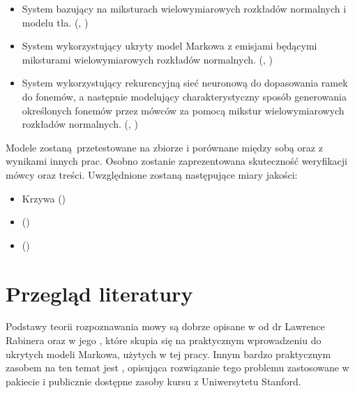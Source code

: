 \begin{itemize}
    \item System bazujący na miksturach wielowymiarowych rozkładów normalnych i modelu tła. (, )
    \item System wykorzystujący ukryty model Markowa z emisjami będącymi miksturami wielowymiarowych rozkładów normalnych. (, )
    \item System wykorzystujący rekurencyjną sieć neuronową do dopasowania ramek do fonemów, a następnie modelujący charakterystyczny sposób generowania określonych fonemów przez mówców za pomocą mikstur wielowymiarowych rozkładów normalnych. (, )
\end{itemize}

Modele zostaną przetestowane na zbiorze  i porównane między sobą oraz z wynikami innych prac.
Osobno zostanie zaprezentowana skuteczność weryfikacji mówcy oraz treści. Uwzględnione zostaną następujące miary jakości:

\begin{itemize}
    \item Krzywa  ()
    \item {} ()
    \item {} ()
\end{itemize}

\section{Przegląd literatury}\label{sec:przeglad_literatury}

Podstawy teorii rozpoznawania mowy są dobrze opisane w \cite{fundamentalsOfSpeech}
od dr Lawrence Rabinera oraz w jego
\cite{aTutorialOnHidden}, które
skupia się na praktycznym wprowadzeniu do ukrytych modeli Markowa, użytych w tej pracy.
Innym bardzo praktycznym zasobem na ten temat jest \cite{theHtkBook}, opisująca rozwiązanie
tego problemu zastosowane w pakiecie  i publicznie dostępne zasoby
kursu  z Uniwersytetu Stanford.

